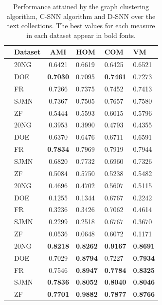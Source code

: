 \documentclass[smallextended]{svjour3}       %
\begin{document}
\begin{table}[!htbp]
\centering
\begin{tabular}{cl|clll}
&\textbf{Dataset} & \textbf{AMI}  & \textbf{HOM} & \textbf{COM} & \textbf{VM} \\ \hline
\parbox[t]{2mm}{}&20NG   &  0.6421          &  0.6619          &  0.6425          & 0.6521  \\
&DOE    &  \textbf{0.7030} &  0.7095          &  \textbf{0.7461} & 0.7273  \\
&FR     &  0.7266          &  0.7375          &  0.7452          & 0.7413  \\
&SJMN   &  0.7367          &  0.7505          &  0.7657          & 0.7580  \\
&ZF     &  0.5444          &  0.5593          &  0.6015          & 0.5796  \\ \hline
\parbox[t]{2mm}{} &20NG   &  0.3953          &  0.3990          &  0.4793          & 0.4355\\
&DOE    &  0.6370          &  0.6476          &  0.6711          & 0.6591\\
&FR     &  \textbf{0.7834} &  0.7969          &  0.7919          & 0.7944\\
&SJMN   &  0.6820          &  0.7732          &  0.6960          & 0.7326\\
&ZF     & 0.5084           &  0.5750          &  0.5238          & 0.5482\\ \hline
\parbox[t]{2mm}{} 
&20NG   & 0.4696  &  0.4702 & 0.5607  & 0.5115  \\
&DOE    & 0.1255  &  0.1344 & 0.6767  & 0.2242  \\
&FR     & 0.3236  &  0.3426 & 0.7062  & 0.4614  \\
&SJMN   & 0.2299  &  0.2518 & 0.6767  & 0.3670  \\
&ZF     & 0.0536  &  0.0648 & 0.6072  & 0.1171  \\ \hline
\parbox[t]{2mm}{} &20NG   & \textbf{0.8218}  &  \textbf{0.8262} & \textbf{0.9167}  & \textbf{0.8691}  \\
&DOE    & 0.7029           &  \textbf{0.8794} & 0.7227           & \textbf{0.7934}  \\
&FR     & 0.7546           &  \textbf{0.8947} & \textbf{0.7784}  & \textbf{0.8325}  \\
&SJMN   & \textbf{0.7836}  &  \textbf{0.8052} & \textbf{0.8040}  & \textbf{0.8046}  \\
&ZF     & \textbf{0.7701}  &  \textbf{0.9882} & \textbf{0.7877}  & \textbf{0.8766}  \\ \hline
\end{tabular}
\caption{Performance attained by the graph clustering algorithm, C-SNN algorithm and D-SNN over the text collections. The best values for each measure in each dataset appear in bold fonts.}
\label{table:results}
\end{table}
\end{document}
